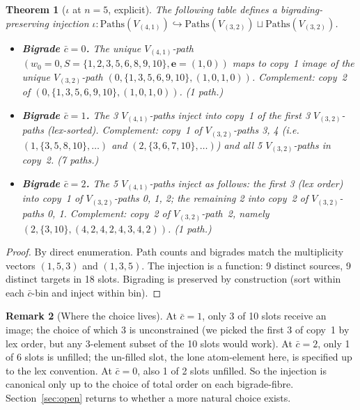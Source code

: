 \documentclass[11pt]{article}
\newtheorem{theorem}{Theorem}
\theoremstyle{definition}
\newtheorem{remark}[theorem]{Remark}
\begin{document}
\begin{theorem}[$\iota$ at $n=5$, explicit]\label{thm:iota}
The following table defines a bigrading-preserving injection $\iota: \mathrm{Paths}(V_{(4,1)}) \hookrightarrow \mathrm{Paths}(V_{(3,2)}) \sqcup \mathrm{Paths}(V_{(3,2)})$.
\begin{itemize}[leftmargin=2em,topsep=0.3em,itemsep=0.4em]
\item \textbf{Bigrade $\bar c = 0$.} The unique $V_{(4,1)}$-path $(w_0=0, S=\{1,2,3,5,6,8,9,10\}, \mathbf{e}=(1,0))$ maps to copy~1 image of the unique $V_{(3,2)}$-path $(0, \{1,3,5,6,9,10\}, (1,0,1,0))$. Complement: copy~2 of $(0, \{1,3,5,6,9,10\}, (1,0,1,0))$. (1 path.)

\item \textbf{Bigrade $\bar c = 1$.} The 3 $V_{(4,1)}$-paths inject into copy~1 of the first 3 $V_{(3,2)}$-paths (lex-sorted). Complement: copy~1 of $V_{(3,2)}$-paths 3, 4 (i.e.\ $(1,\{3,5,8,10\},\dots)$ and $(2,\{3,6,7,10\},\dots)$) and all 5 $V_{(3,2)}$-paths in copy~2. (7 paths.)

\item \textbf{Bigrade $\bar c = 2$.} The 5 $V_{(4,1)}$-paths inject as follows: the first 3 (lex order) into copy~1 of $V_{(3,2)}$-paths 0, 1, 2; the remaining 2 into copy~2 of $V_{(3,2)}$-paths 0, 1. Complement: copy~2 of $V_{(3,2)}$-path~2, namely $(2,\{3,10\},(4,2,4,2,4,3,4,2))$. (1 path.)
\end{itemize}
\end{theorem}

\begin{proof}
By direct enumeration. Path counts and bigrades match the multiplicity vectors $(1,5,3)$ and $(1,3,5)$. The injection is a function: 9 distinct sources, 9 distinct targets in 18 slots. Bigrading is preserved by construction (sort within each $\bar c$-bin and inject within bin). \qedhere
\end{proof}

\begin{remark}[Where the choice lives]\label{rem:choice}
At $\bar c = 1$, only 3 of 10 slots receive an image; the choice of which 3 is unconstrained (we picked the first 3 of copy~1 by lex order, but any 3-element subset of the 10 slots would work). At $\bar c = 2$, only 1 of 6 slots is unfilled; the un-filled slot, the lone atom-element here, is specified up to the lex convention. At $\bar c = 0$, also 1 of 2 slots unfilled. So the injection is canonical only up to the choice of total order on each bigrade-fibre. Section~\ref{sec:open} returns to whether a more natural choice exists.
\end{remark}
\end{document}
